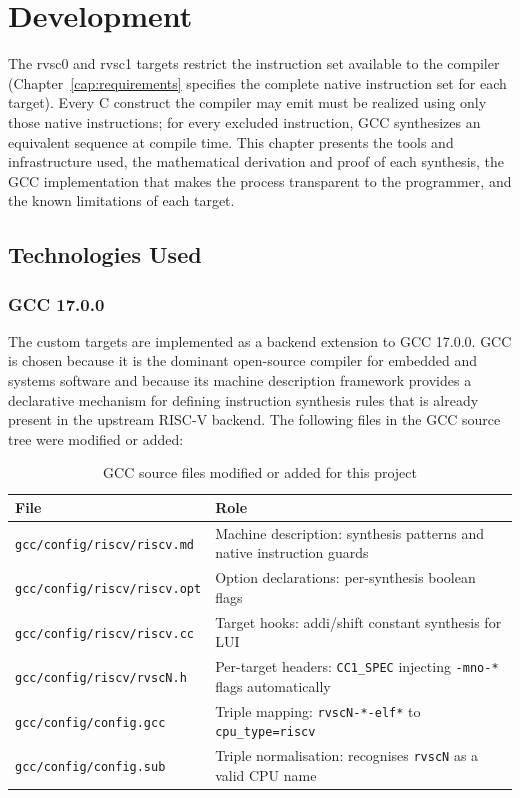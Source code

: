 \chapter{Development} \label{cap:development}

The rvsc0 and rvsc1 targets restrict the instruction set available to the compiler
(Chapter~\ref{cap:requirements} specifies the complete native instruction set for each target). Every
C construct the compiler may emit must be realized using only those native instructions; for every
excluded instruction, GCC synthesizes an equivalent sequence at compile time. This chapter presents
the tools and infrastructure used, the mathematical derivation and proof of each synthesis, the GCC
implementation that makes the process transparent to the programmer, and the known limitations of each
target.

\section{Technologies Used}

\subsection{GCC 17.0.0}

The custom targets are implemented as a backend extension to GCC 17.0.0. GCC is chosen because it is
the dominant open-source compiler for embedded and systems software and because its machine description
framework provides a declarative mechanism for defining instruction synthesis rules that is already
present in the upstream RISC-V backend. The following files in the GCC source tree were modified or
added:

\begin{table}[htb]
\centering
\caption{GCC source files modified or added for this project}
\label{tab:gcc-files}
\begin{tabular}{p{5.0cm}p{9.5cm}}
\toprule
\textbf{File} & \textbf{Role} \\
\midrule
\texttt{gcc/config/riscv/riscv.md}  & Machine description: synthesis patterns and native instruction guards \\
\nolinkurl{gcc/config/riscv/riscv.opt} & Option declarations: per-synthesis boolean flags \\
\texttt{gcc/config/riscv/riscv.cc}  & Target hooks: addi/shift constant synthesis for LUI \\
\texttt{gcc/config/riscv/rvscN.h}   & Per-target headers: \texttt{CC1\_SPEC} injecting \texttt{-mno-*} flags automatically \\
\texttt{gcc/config/config.gcc}      & Triple mapping: \texttt{rvscN-*-elf*} to \texttt{cpu\_type=riscv} \\
\texttt{gcc/config/config.sub}      & Triple normalisation: recognises \texttt{rvscN} as a valid CPU name \\
\bottomrule
\end{tabular}
\end{table}

